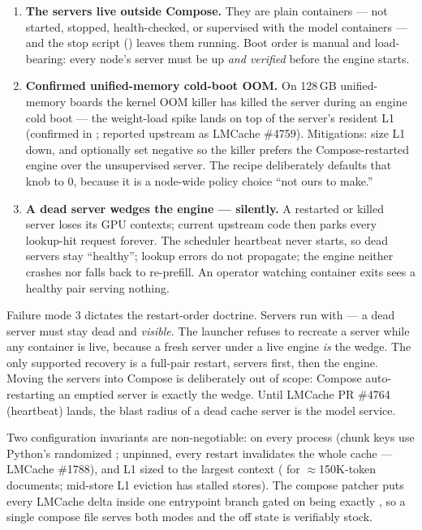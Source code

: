 \begin{enumerate}
\item \textbf{The servers live outside Compose.} They are plain
 containers --- not started, stopped, health-checked, or
supervised with the model containers --- and the stop script
() leaves them running. Boot order
is manual and load-bearing: every node's server must be up \emph{and
verified} before the engine starts.
\item \textbf{Confirmed unified-memory cold-boot OOM.} On 128\,GB
unified-memory boards the kernel OOM killer has killed the server during an
engine cold boot --- the weight-load spike lands on top of the server's
resident L1 (confirmed in ; reported upstream as LMCache \#4759).
Mitigations: size L1 down, and optionally set 
negative so the killer prefers the Compose-restarted engine over the
unsupervised server. The recipe deliberately defaults that knob to 0,
because it is a node-wide policy choice ``not ours to make.''
\item \textbf{A dead server wedges the engine --- silently.} A restarted or
killed server loses its GPU contexts; current upstream code then parks every
lookup-hit request forever. The scheduler heartbeat never starts, so dead
servers stay ``healthy''; lookup errors do not propagate; the engine neither
crashes nor falls back to re-prefill. An operator watching container exits
sees a healthy pair serving nothing.
\end{enumerate}

\begin{hbwarning}
Failure mode 3 dictates the restart-order doctrine. Servers run with
 --- a dead server must stay dead and \emph{visible}.
The launcher refuses to recreate a server while any 
container is live, because a fresh server under a live engine \emph{is} the
wedge. The only supported recovery is a full-pair restart, servers first,
then the engine. Moving the servers into Compose is deliberately out of
scope: Compose auto-restarting an emptied server is exactly the wedge. Until
LMCache PR \#4764 (heartbeat) lands, the blast radius of a dead cache server
is the model service.
\end{hbwarning}

Two configuration invariants are non-negotiable:  on
every process (chunk keys use Python's randomized ; unpinned,
every restart invalidates the whole cache --- LMCache \#1788), and L1 sized
to the largest context ( for $\approx$150K-token
documents; mid-store L1 eviction has stalled stores). The compose patcher
puts every LMCache delta inside one entrypoint branch gated on
 being exactly , so a single compose
file serves both modes and the off state is verifiably stock.

